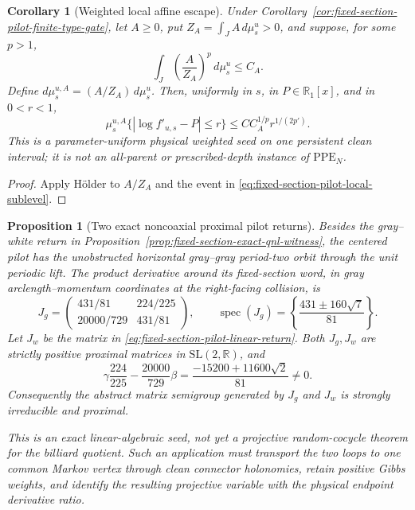 \documentclass[11pt]{article}
\newtheorem{proposition}[theorem]{Proposition}
\newtheorem{corollary}[theorem]{Corollary}
\begin{document}
\begin{corollary}[Weighted local affine escape]
\label{cor:fixed-section-weighted-local-affine-escape}
Under Corollary~\ref{cor:fixed-section-pilot-finite-type-gate}, let
$A\ge0$, put $Z_A=\int_JA\,d\mu_s^u>0$, and suppose, for some $p>1$,
\[
 \int_J\left(\frac A{Z_A}\right)^p\,d\mu_s^u\le C_A.
\]
Define $d\mu_s^{u,A}=(A/Z_A)\,d\mu_s^u$.  Then, uniformly in $s$, in
$P\in\mathbb R_1[x]$, and in $0<r<1$,
\begin{equation}
\label{eq:fixed-section-weighted-local-sublevel}
 \mu_s^{u,A}
 \{|\log f'_{u,s}-P|\le r\}
 \le C C_A^{1/p}r^{1/(2p')}.
\end{equation}
This is a parameter-uniform physical weighted seed on one persistent clean
interval; it is not an all-parent or prescribed-depth instance of
$\mathrm{PPE}_N$.
\end{corollary}

\begin{proof}
Apply H\"older to $A/Z_A$ and the event in
\eqref{eq:fixed-section-pilot-local-sublevel}.
\end{proof}

\begin{proposition}[Two exact noncoaxial proximal pilot returns]
\label{prop:fixed-section-pilot-sip-seed}
Besides the gray--white return in
Proposition~\ref{prop:fixed-section-exact-qnl-witness}, the centered pilot
has the unobstructed horizontal gray--gray period-two orbit through the
unit periodic lift.  The product derivative around its fixed-section word,
in gray arclength--momentum coordinates at the right-facing collision, is
\begin{equation}
\label{eq:fixed-section-gray-gray-return}
 J_g=
 \begin{pmatrix}
  431/81&224/225\\[2pt]
  20000/729&431/81
 \end{pmatrix},
 \qquad
 \operatorname{spec}(J_g)
 =\left\{\frac{431\pm160\sqrt7}{81}\right\}.
\end{equation}
Let $J_w$ be the matrix in
\eqref{eq:fixed-section-pilot-linear-return}.  Both $J_g,J_w$ are strictly
positive proximal matrices in $\mathrm{SL}(2,\mathbb R)$, and
\begin{equation}
\label{eq:fixed-section-pilot-eigenline-obstruction}
 \gamma\frac{224}{225}
 -\frac{20000}{729}\beta
 =\frac{-15200+11600\sqrt2}{81}\ne0.
\end{equation}
Consequently the abstract matrix semigroup generated by $J_g$ and $J_w$ is
strongly irreducible and proximal.

This is an exact linear-algebraic seed, not yet a projective random-cocycle
theorem for the billiard quotient.  Such an application must transport the
two loops to one common Markov vertex through clean connector holonomies,
retain positive Gibbs weights, and identify the resulting projective
variable with the physical endpoint derivative ratio.
\end{proposition}
\end{document}
